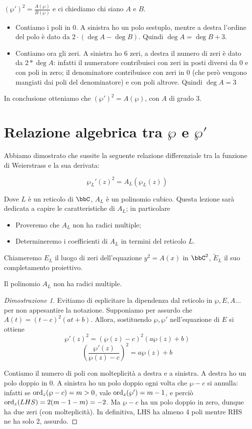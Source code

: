 $(\wp')^2=\frac{A(\wp)}{B(\wp)}$ e ci chiediamo chi siano $A$ e $B$.

\begin{itemize}
 \item Contiamo i poli in 0. A sinistra ho un polo sestuplo, mentre a destra l'ordine del polo è dato da $2\cdot (\deg A - \deg B)$. Quindi $\deg A = \deg B + 3$.
 \item Contiamo ora gli zeri. A sinistra ho 6 zeri, a destra il numero di zeri è dato da $2*\deg A$: infatti il numeratore contribuisci con zeri in posti diversi da 0 e con poli in zero; il denominatore contribuisce con zeri in 0 (che però vengono mangiati dai poli del denominatore) e con poli altrove. Quindi $\deg A = 3$
\end{itemize}

In conclusione otteniamo che $(\wp')^2=A(\wp)$, con $A$ di grado 3.

\section{Relazione algebrica tra $\wp$ e $\wp'$}

Abbiamo dimostrato che sussite la seguente relazione differenziale tra la funzione di Weierstrass e la sua derivata:

$$\wp_L'(z)^2 = A_L(\wp_L(z)) $$

Dove $L$ è un reticolo di $\bbC$,  $A_L$ è un polinomio cubico. Questa lezione sarà dedicata a capire le caratteristiche di $A_L$; in particolare
\begin{itemize}
\item Proveremo che $A_L$ non ha radici multiple;
\item Determineremo i coefficienti di $A_L$ in termini del reticolo $L$.
\end{itemize}

Chiameremo $E_L$ il luogo di zeri dell'equazione $y^2=A(x)$ in $\bbC^2$, $\tilde{E}_L$ il suo completamento proiettivo.
\begin{proposizione}
Il polinomio $A_L$ non ha radici multiple.
\end{proposizione}

\begin{proof}[Dimostrazione 1]
Evitiamo di esplicitare la dipendenza dal reticolo in $\wp, E,A \dots$ per non appesantire la notazione. Supponiamo per assurdo che $A(t) = (t-c)^2(at+b)$. Allora, sostituendo $\wp, \wp'$ nell'equazione di $E$ si ottiene
$$\wp'(z)^2 = (\wp(z) - c)^2(a\wp(z)+b) $$
$$ \left ( \frac{\wp'(z)}{\wp(z)-c} \right )^2 = a\wp(z)+b $$

Contiamo il numero di poli con molteplicità a destra e a sinistra. A destra ho un polo doppio in $0$. A sinistra ho un polo doppio ogni volta che $\wp - c$ si annulla: infatti se $\text{ord}_{z}(\wp -c) = m > 0$, vale $\text{ord}_{z}(\wp') = m-1$, e perciò $\text{ord}_{z}(LHS) = 2(m-1-m) = -2$. Ma $\wp-c$ ha un polo doppio in zero, dunque ha due zeri (con molteplicità). In definitiva, LHS ha almeno 4 poli mentre RHS ne ha solo 2, assurdo.
\end{proof}

